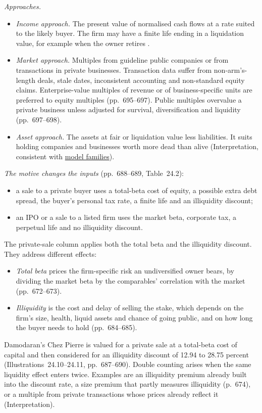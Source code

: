 \begin{qfmethod}\label{meth:private-company-valuation}
 \emph{Approaches.}
\begin{itemize}
\item \emph{Income approach.} The present value of normalised cash flows at a rate suited to the likely buyer. The firm may have a finite life ending in a liquidation value, for example when the owner retires \citep[pp.~681--682]{investment-valuation-2012}.
\item \emph{Market approach.} Multiples from guideline public companies or from transactions in private businesses. Transaction data suffer from non-arm's-length deals, stale dates, inconsistent accounting and non-standard equity claims. Enterprise-value multiples of revenue or of business-specific units are preferred to equity multiples (pp.~695--697). Public multiples overvalue a private business unless adjusted for survival, diversification and liquidity (pp.~697--698).
\item \emph{Asset approach.} The assets at fair or liquidation value less liabilities. It suits holding companies and businesses worth more dead than alive (Interpretation, consistent with \hyperref[def:valuation-model-families]{model families}).
\end{itemize}

\emph{The motive changes the inputs} (pp.~688--689, Table~24.2):
\begin{itemize}
\item a sale to a private buyer uses a total-beta cost of equity, a possible extra debt spread, the buyer's personal tax rate, a finite life and an illiquidity discount;
\item an IPO or a sale to a listed firm uses the market beta, corporate tax, a perpetual life and no illiquidity discount.
\end{itemize}
The private-sale column applies both the total beta and the illiquidity discount. They address different effects:
\begin{itemize}
\item \emph{Total beta} prices the firm-specific risk an undiversified owner bears, by dividing the market beta by the comparables' correlation with the market (pp.~672--673).
\item \emph{Illiquidity} is the cost and delay of selling the stake, which depends on the firm's size, health, liquid assets and chance of going public, and on how long the buyer needs to hold (pp.~684--685).
\end{itemize}
Damodaran's Chez Pierre is valued for a private sale at a total-beta cost of capital and then considered for an illiquidity discount of 12.94 to 28.75 percent (Illustrations~24.10--24.11, pp.~687--690). Double counting arises when the same liquidity effect enters twice. Examples are an illiquidity premium already built into the discount rate, a size premium that partly measures illiquidity (p.~674), or a multiple from private transactions whose prices already reflect it (Interpretation).


\end{qfmethod}
